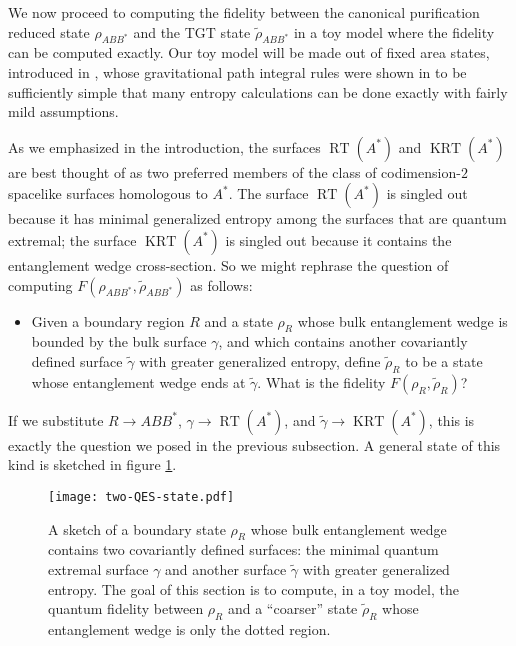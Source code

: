 \documentclass[a4paper,11pt]{article}
\renewcommand{\tilde}{\widetilde}
\newcommand{\RT}{\operatorname{RT}}
\newcommand{\KRT}{\operatorname{KRT}}
\begin{document}
We now proceed to computing the fidelity between the canonical purification reduced state $\rho_{ABB^*}$ and the TGT state $\tilde{\rho}_{ABB^*}$ in a toy model where the fidelity can be computed exactly. Our toy model will be made out of fixed area states, introduced in \cite{fixed-area-AR, fixed-area-DHM}, whose gravitational path integral rules were shown in \cite{fixed-area-DHM} to be sufficiently simple that many entropy calculations can be done exactly with fairly mild assumptions.

As we emphasized in the introduction, the surfaces $\RT(A^*)$ and $\KRT(A^*)$ are best thought of as two preferred members of the class of codimension-$2$ spacelike surfaces homologous to $A^*$. The surface $\RT(A^*)$ is singled out because it has minimal generalized entropy among the surfaces that are quantum extremal; the surface $\KRT(A^*)$ is singled out because it contains the entanglement wedge cross-section. So we might rephrase the question of computing $F(\rho_{ABB^*}, \tilde{\rho}_{ABB^*})$ as follows: 
\begin{itemize}
    \item Given a boundary region $R$ and a state $\rho_{R}$ whose bulk entanglement wedge is bounded by the bulk surface $\gamma$, and which contains another covariantly defined surface $\tilde{\gamma}$ with greater generalized entropy, define $\tilde{\rho}_{R}$ to be a state whose entanglement wedge ends at $\tilde{\gamma}$. What is the fidelity $F(\rho_R, \tilde{\rho}_{R})$? 
\end{itemize}
If we substitute $R \rightarrow ABB^*$, $\gamma \rightarrow \RT(A^*)$, and $\tilde{\gamma} \rightarrow \KRT(A^*)$, this is exactly the question we posed in the previous subsection. A general state of this kind is sketched in figure \ref{fig:two-QES-state}.

\begin{figure}
    \centering
    \texttt{[image: two-QES-state.pdf]}
    \caption{A sketch of a boundary state $\rho_{R}$ whose bulk entanglement wedge contains two covariantly defined surfaces: the minimal quantum extremal surface $\gamma$ and another surface $\tilde{\gamma}$ with greater generalized entropy. The goal of this section is to compute, in a toy model, the quantum fidelity between $\rho_{R}$ and a ``coarser'' state $\tilde{\rho}_{R}$ whose entanglement wedge is only the dotted region.}
    \label{fig:two-QES-state}
\end{figure}
\end{document}
